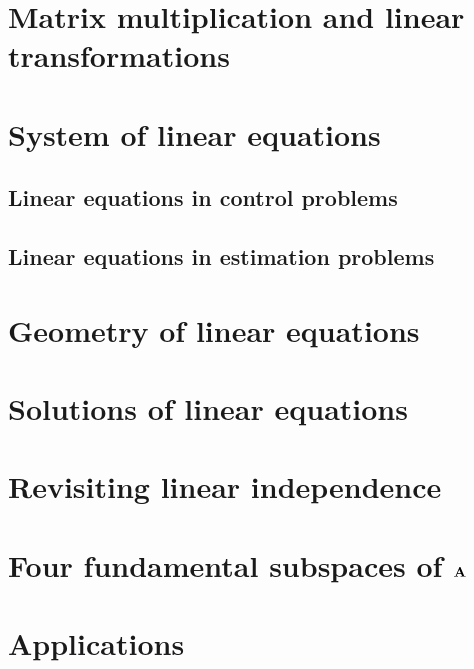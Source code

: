 \section{Matrix multiplication and linear transformations}\label{sec:ch03-mat-mult-lin-trans}


\section{System of linear equations}\label{sec:ch03-sys-lin-eqn}

\subsection{Linear equations in control problems}


\subsection{Linear equations in estimation problems}


\section{Geometry of linear equations}


\section{Solutions of linear equations}


\section{Revisiting linear independence}

\section{Four fundamental subspaces of $\mathbf{A}$}


\section{Applications}